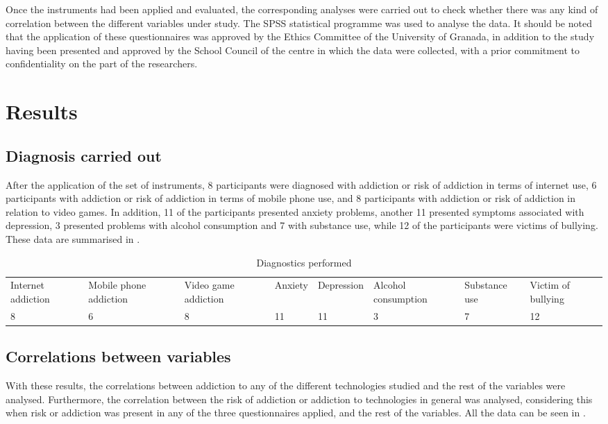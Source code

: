 \documentclass[english]{textolivre}
\begin{document}
Once the instruments had been applied and evaluated, the corresponding analyses were carried out to check whether there was any kind of correlation between the different variables under study. The SPSS statistical programme was used to analyse the data. It should be noted that the application of these questionnaires was approved by the Ethics Committee of the University of Granada, in addition to the study having been presented and approved by the School Council of the centre in which the data were collected, with a prior commitment to confidentiality on the part of the researchers.


\section{Results}\label{sec-results}
\subsection{Diagnosis carried out}\label{diagnosis}
After the application of the set of instruments, 8 participants were diagnosed with addiction or risk of addiction in terms of internet use, 6 participants with addiction or risk of addiction in terms of mobile phone use, and 8 participants with addiction or risk of addiction in relation to video games. In addition, 11 of the participants presented anxiety problems, another 11 presented symptoms associated with depression, 3 presented problems with alcohol consumption and 7 with substance use, while 12 of the participants were victims of bullying. These data are summarised in .

\begin{table}[htpb]
\centering
\begin{threeparttable}
\caption{Diagnostics performed}\label{tbl02}
\begin{tabular}{@{}*{8}{p{}}@{}}
\toprule
Internet addiction & Mobile phone addiction & Video game addiction & Anxiety & Depression & Alcohol consumption & Substance use & Victim of bullying \\
8 & 6 & 8 & 11 & 11 & 3 & 7 & 12 \\
\bottomrule
\end{tabular}
\end{threeparttable}
\end{table}


\subsection{Correlations between variables}\label{sec-corr}
With these results, the correlations between addiction to any of the different technologies studied and the rest of the variables were analysed. Furthermore, the correlation between the risk of addiction or addiction to technologies in general was analysed, considering this when risk or addiction was present in any of the three questionnaires applied, and the rest of the variables. All the data can be seen in .
\end{document}
